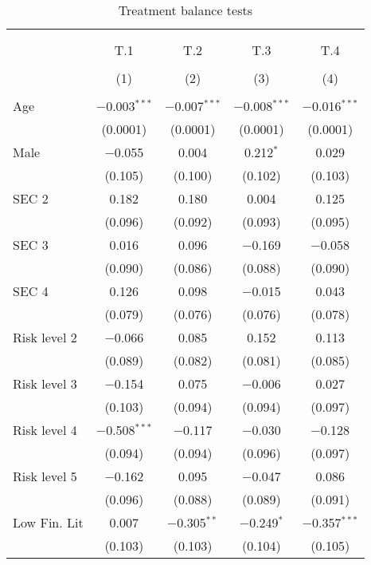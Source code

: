 
\begin{table}[!htbp] \centering 
  \caption{Treatment balance tests} 
  \label{tbl:balance} 
\begin{tabular}{@{\extracolsep{5pt}}lcccc} 
\\[-1.8ex]\hline 
\hline \\[-1.8ex] 
\\[-1.8ex] & T.1 & T.2 & T.3 & T.4 \\ 
\\[-1.8ex] & (1) & (2) & (3) & (4)\\ 
\hline \\[-1.8ex] 
 Age & $-$0.003$^{***}$ & $-$0.007$^{***}$ & $-$0.008$^{***}$ & $-$0.016$^{***}$ \\ 
  & (0.0001) & (0.0001) & (0.0001) & (0.0001) \\ 
  Male & $-$0.055 & 0.004 & 0.212$^{*}$ & 0.029 \\ 
  & (0.105) & (0.100) & (0.102) & (0.103) \\ 
  SEC 2 & 0.182 & 0.180 & 0.004 & 0.125 \\ 
  & (0.096) & (0.092) & (0.093) & (0.095) \\ 
  SEC 3 & 0.016 & 0.096 & $-$0.169 & $-$0.058 \\ 
  & (0.090) & (0.086) & (0.088) & (0.090) \\ 
  SEC 4 & 0.126 & 0.098 & $-$0.015 & 0.043 \\ 
  & (0.079) & (0.076) & (0.076) & (0.078) \\ 
  Risk level 2 & $-$0.066 & 0.085 & 0.152 & 0.113 \\ 
  & (0.089) & (0.082) & (0.081) & (0.085) \\ 
  Risk level 3 & $-$0.154 & 0.075 & $-$0.006 & 0.027 \\ 
  & (0.103) & (0.094) & (0.094) & (0.097) \\ 
  Risk level 4 & $-$0.508$^{***}$ & $-$0.117 & $-$0.030 & $-$0.128 \\ 
  & (0.094) & (0.094) & (0.096) & (0.097) \\ 
  Risk level 5 & $-$0.162 & 0.095 & $-$0.047 & 0.086 \\ 
  & (0.096) & (0.088) & (0.089) & (0.091) \\ 
  Low Fin. Lit & 0.007 & $-$0.305$^{**}$ & $-$0.249$^{*}$ & $-$0.357$^{***}$ \\ 
  & (0.103) & (0.103) & (0.104) & (0.105) \\ 

\end{tabular}
\end{table}
